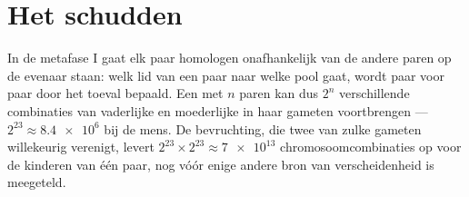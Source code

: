 \section{Het schudden}

\begin{proposition}\label{prop:g12:meiosis-genetic-shuffling:assortment}
In de metafase I gaat elk paar homologen onafhankelijk van de andere
paren op de evenaar staan: welk lid van een paar naar welke pool gaat,
wordt paar voor paar door het toeval bepaald. Een  met $n$ paren kan
dus $2^n$ verschillende combinaties van vaderlijke en moederlijke
 in haar gameten voortbrengen --- $2^{23} \approx \num{8.4e6}$
bij de mens. De bevruchting, die twee van zulke gameten willekeurig
verenigt, levert $2^{23}
\times 2^{23} \approx \num{7e13}$ chromosoomcombinaties op voor de
kinderen van één paar, nog vóór enige andere bron van verscheidenheid is
meegeteld.
\end{proposition}
\admitted

